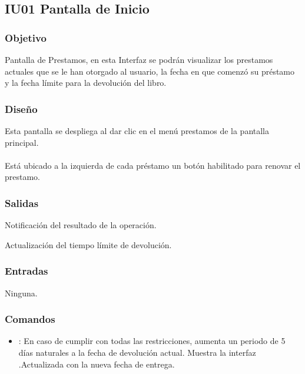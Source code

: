 \newpage
\subsection{IU01 Pantalla de Inicio}

\subsubsection{Objetivo}
	Pantalla de Prestamos, en esta Interfaz se podrán visualizar los prestamos actuales que se le han otorgado al usuario, la fecha en que comenzó su préstamo y la fecha límite para la devolución del libro.  
	
\subsubsection{Diseño}
	Esta pantalla se despliega al dar clic en el menú prestamos de la pantalla principal.  \\\\
	Está ubicado a la izquierda de cada préstamo un botón habilitado para renovar el prestamo. 



\subsubsection{Salidas}
	\begin{Citemize}
	\item Notificación del resultado de la operación. 
	\item Actualización del tiempo límite de devolución.
			\end{Citemize}
	
\subsubsection{Entradas}
	\begin{Citemize}
		\item Ninguna.
	\end{Citemize}

\subsubsection{Comandos}
\begin{itemize}
	\item {}: En caso de cumplir con todas las restricciones, aumenta un periodo de 5 días naturales a la fecha de devolución actual.
 Muestra la interfaz .Actualizada con la nueva fecha de entrega.
\end{itemize}

